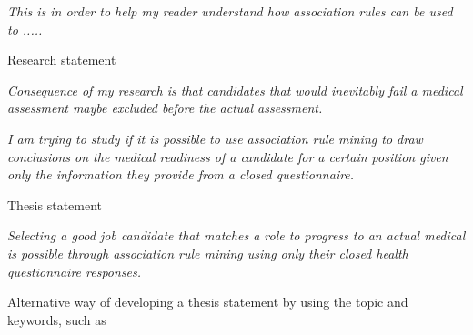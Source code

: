 \documentclass{ruthesis}
\begin{document}
\textit{This is in order to help my reader understand how association rules can be used to  .....}

\noindent
Research statement

\textit{Consequence of my research is that candidates that would inevitably fail a medical assessment maybe excluded before the actual assessment.}

\textit{I am trying to study if it is possible to use association rule mining to draw conclusions on the medical readiness of a candidate for a certain position given only the information they provide from a closed questionnaire.}

\noindent
Thesis statement

\textit{Selecting a good job candidate that matches a role to progress to an actual medical is possible through association rule mining using only their closed health questionnaire responses.}  

\noindent
Alternative way of developing a thesis statement by using the topic and keywords, such as

\vspace{8pt}
\end{document}
